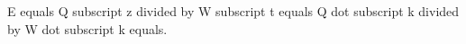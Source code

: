 E equals Q subscript z divided by W subscript t equals Q dot subscript k divided by W dot subscript k equals.